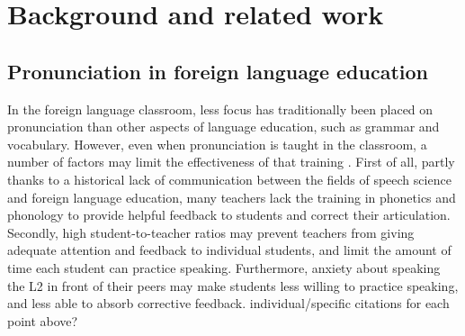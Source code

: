 %
%
\chapter{Background and related work}
\label{chap:background}



	\section{Pronunciation in foreign language education}
	\label{sec:capt:l2ed}
%	


In the foreign language classroom, less focus has traditionally been placed on pronunciation than other aspects of language education, such as grammar and vocabulary. %
However, even when pronunciation is taught in the classroom, a number of factors may limit the effectiveness of that training \citep{Neri2002,Derwing2005}. First of all, partly thanks to a historical lack of communication between the fields of speech science and foreign language education, many teachers lack the training in phonetics and phonology to provide helpful feedback to students and correct their articulation. Secondly, high student-to-teacher ratios may prevent teachers from giving adequate attention and feedback to individual students, and limit the amount of time each student can practice speaking. Furthermore, anxiety about speaking the L2 in front of their peers may make students less willing to practice speaking, and less able to absorb corrective feedback. 
{individual/specific citations for each point above?}




